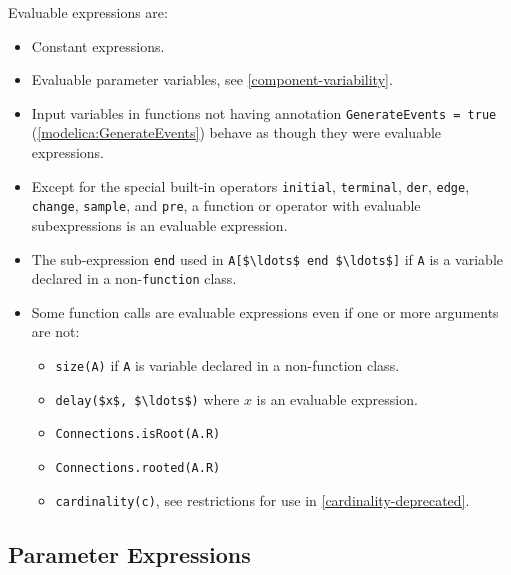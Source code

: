 Evaluable expressions are:
\begin{itemize}
\item
  Constant expressions.
\item
  Evaluable parameter variables, see \cref{component-variability}.
\item
  Input variables in functions not having annotation \lstinline!GenerateEvents = true! (\cref{modelica:GenerateEvents}) behave as though they were evaluable expressions.
\item
  Except for the special built-in operators \lstinline!initial!, \lstinline!terminal!, \lstinline!der!, \lstinline!edge!, \lstinline!change!, \lstinline!sample!, and \lstinline!pre!, a function or operator with evaluable subexpressions is an evaluable expression.
\item
  The sub-expression \lstinline!end! used in \lstinline!A[$\ldots$ end $\ldots$]! if \lstinline!A! is a variable declared in a non-\lstinline!function! class.
\item
  Some function calls are evaluable expressions even if one or more arguments are not:
  \begin{itemize}
  \item
    \lstinline!size(A)! if \lstinline!A! is variable declared in a non-function class.
  \item
    \lstinline!delay($x$, $\ldots$)! where $x$ is an evaluable expression.
  \item
    \lstinline!Connections.isRoot(A.R)!
  \item
    \lstinline!Connections.rooted(A.R)!
  \item
    \lstinline!cardinality(c)!, see restrictions for use in \cref{cardinality-deprecated}.
  \end{itemize}
\end{itemize}

\subsection{Parameter Expressions}\label{parameter-expressions}

